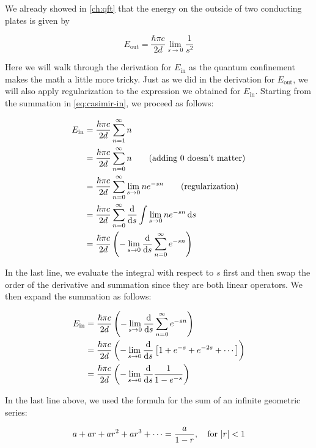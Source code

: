 We already showed in \autoref{ch:qft} that the energy on the outside of two conducting plates is given by

\begin{equation}
	E_{\text{out}} = \frac{\hbar \pi c}{2d} \lim\limits_{s \rightarrow 0} \frac{1}{s^2}  \label{eq:casimir-out-app}
\end{equation}

Here we will walk through the derivation for $E_{\text{in}}$ as the quantum confinement makes the math a little more tricky. 
Just as we did in the derivation for $E_{\text{out}}$, we will also apply regularization to the expression we obtained for $E_{\text{in}}$. 
Starting from the summation in \autoref{eq:casimir-in}, we proceed as follows:

\begin{align*}
	E_{\text{in}} &= \frac{\hbar \pi c}{2d} \sum_{n=1}^{\infty} n \\
	&= \frac{\hbar \pi c}{2d} \sum_{n=0}^{\infty} n \tag{adding 0 doesn't matter} \\
	&= \frac{\hbar \pi c}{2d} \sum_{n=0}^{\infty} \lim\limits_{s \rightarrow 0} ne^{-sn} \tag{regularization} \\
	&= \frac{\hbar \pi c}{2d} \sum_{n=0}^{\infty} \dv{s} \int \lim\limits_{s \rightarrow 0} ne^{-sn} \dd{s} \\
	&= \frac{\hbar \pi c}{2d} \left( - \lim\limits_{s \rightarrow 0} \dv{s} \sum_{n=0}^{\infty} e^{-sn} \right)
\end{align*}

In the last line, we evaluate the integral with respect to $s$ first and then swap the order of the derivative and summation since they are both linear operators. 
We then expand the summation as follows:

\begin{align*} 
	E_{\text{in}} &= \frac{\hbar \pi c}{2d} \left( - \lim\limits_{s \rightarrow 0} \dv{s} \sum_{n=0}^{\infty} e^{-sn} \right) \\
	&= \frac{\hbar \pi c}{2d} \left( - \lim\limits_{s \rightarrow 0} \dv{s} \left[ 1 + e^{-s} + e^{-2s} + \cdots \right] \right) \\
	&= \frac{\hbar \pi c}{2d} \left( - \lim\limits_{s \rightarrow 0} \dv{s} \frac{1}{1-e^{-s}} \right)
\end{align*}

In the last line above, we used the formula for the sum of an infinite geometric series: 

\begin{equation*}
	a + ar + ar^2 + ar^3 + \cdots = \frac{a}{1-r},\quad \text{for}\ \abs{r} < 1
\end{equation*}


